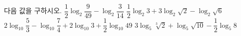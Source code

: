 다음 값을 구하시오.
 $\dfrac{1}{2}\log_2 \dfrac{9}{49}-\log_2 \dfrac{3}{14}$
 $\dfrac{1}{2}\log_2 3+3\log_2 \sqrt{2}-\log_2 \sqrt{6}$
 $2\log_{10} \dfrac{5}{3}-\log_{10} \dfrac{7}{4}+2\log_{10} 3+\dfrac{1}{2}\log_{10} 49$
 $3\log_5 \sqrt[3]{2}+\log_5 \sqrt{10}-\dfrac{1}{2}\log_5 8$
